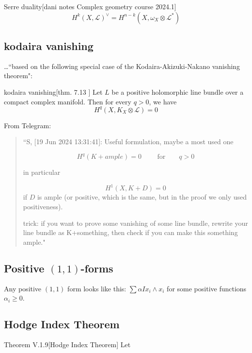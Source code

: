 \begin{thing6}{Serre duality}[dani notes Complex geometry course 2024.1]\leavevmode
\[H^{k}(X,\mathcal{L})^{\vee}=H^{n-k}(X,\omega_X \otimes \mathcal{L}^*)\]
\end{thing6}

\subsection{kodaira vanishing}
…``based on the following special case of the Kodaira-Akizuki-Nakano vanishing theorem":
\begin{thing6}{kodaira vanishing}[thm. 7.13 \cite{voi}]\label{thm:kodaira vanishing}\leavevmode
	Let \(L\) be a positive holomorphic line bundle over a compact complex manifold. Then for every \(q>0\), we have
	\[\boxed{H^{q}(X,K_X \otimes \mathcal{L})=0}\]
\end{thing6}

From Telegram:

\begin{quotation}
	``S, [19 Jun 2024 13:31:41]:
Useful formulation, maybe a most used one

\[H^q(K+ample) = 0 \qquad \text{ for}\qquad  q>0\]

in particular

\[H^1(X,K+D) = 0\] if \(D\) is ample (or positive, which is the same, but in the proof we only used positiveness).



trick: if you want to prove some vanishing of some line bundle, rewrite your line bundle as K+something, then check if you can make this something ample."
\end{quotation}

\subsection{Positive \((1,1)\)-forms}
Any positive \((1,1)\) form looks like this: \(\sum \alpha I x_i \wedge x_i\) for some positive functions \(\alpha_i \geq 0\).

\subsection{Hodge Index Theorem}

\begin{thing4}{Theorem V.1.9}[Hodge Index Theorem]\label{prop:V.1.9}\leavevmode
Let
\end{thing4}


